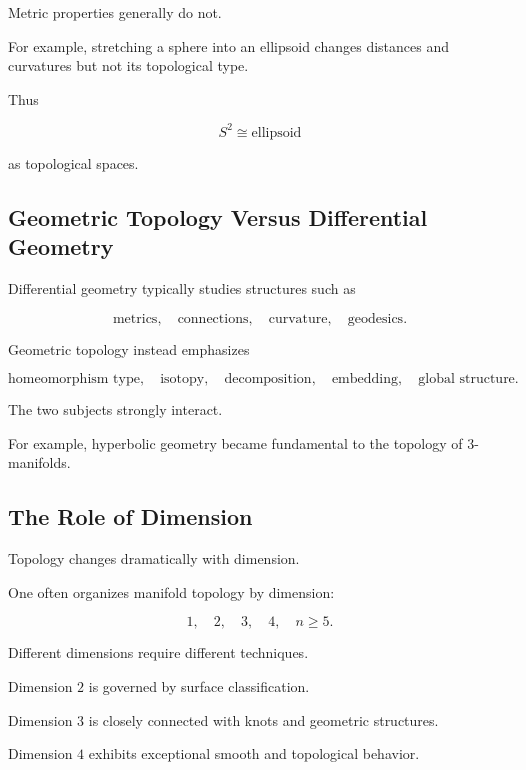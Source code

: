 Metric properties generally do not.

For example, stretching a sphere into an ellipsoid changes distances and
curvatures but not its topological type.

Thus

\[
\boxed{
S^2
\cong
\text{ellipsoid}
}
\]

as topological spaces.

\subsection{Geometric Topology Versus Differential Geometry}
\label{subsec:geometric-topology-vs-differential-geometry}

Differential geometry typically studies structures such as

\[
\boxed{
\text{metrics},
\quad
\text{connections},
\quad
\text{curvature},
\quad
\text{geodesics}.
}
\]

Geometric topology instead emphasizes

\[
\boxed{
\text{homeomorphism type},
\quad
\text{isotopy},
\quad
\text{decomposition},
\quad
\text{embedding},
\quad
\text{global structure}.
}
\]

The two subjects strongly interact.

For example, hyperbolic geometry became fundamental to the topology of
\(3\)-manifolds.

\subsection{The Role of Dimension}
\label{subsec:dimension-geometric-topology}

Topology changes dramatically with dimension.

One often organizes manifold topology by dimension:

\[
\boxed{
1,\quad2,\quad3,\quad4,\quad n\geq5.
}
\]

Different dimensions require different techniques.

Dimension \(2\) is governed by surface classification.

Dimension \(3\) is closely connected with knots and geometric structures.

Dimension \(4\) exhibits exceptional smooth and topological behavior.

